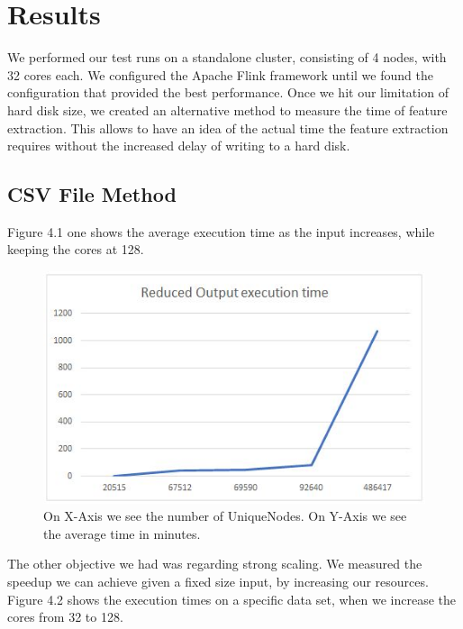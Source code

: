 \chapter{Results}

We performed our test runs on a standalone cluster, consisting of 4 nodes, with 32 cores each. We configured the Apache Flink framework until we found the configuration that provided the best performance. Once we hit our limitation of hard disk size, we created an alternative method to measure the time of feature extraction. This allows to have an idea of the actual time the feature extraction requires without the increased delay of writing to a hard disk.


\section{CSV File Method}

Figure 4.1 one shows the average execution time as the input increases, while keeping the cores at 128.

\begin{figure}[ht]
\includegraphics[width=12cm]{Thesis/figures/figure3.JPG}
\caption{On X-Axis we see the number of Unique\newline Nodes. On Y-Axis we see the average time in minutes. }
\label{fig:graph}
\end{figure}


The other objective we had was regarding strong scaling. We measured the speedup we can achieve given a fixed size input, by increasing our resources. Figure 4.2 shows the execution times on a specific data set, when we increase the cores from 32 to 128.

